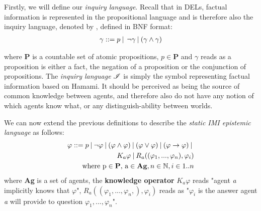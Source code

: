 Firstly, we will define our \textit{inquiry language}. Recall that in
DELs, factual information is represented in the propositional language
and is therefore also the inquiry language, denoted by \oracle, defined in BNF
format:
\begin{align}
    \gamma::= p \:|\:\:\neg\gamma\:|\:(\gamma\land\gamma) \label{eq:1}
\end{align}

where \textbf{P} is a countable set of atomic propositions, $p \in\mathbf{P}$
and $\gamma$ reads as a proposition is either a fact, the negation of a
proposition or the conjunction of propositions. The \textit{inquiry language}
$\mathscr{I}$ is simply the symbol representing factual information based on
Hamami\cite{delimi}. It should be perceived as being the source of
common knowledge between agents, and therefore also do not have any notion of
which agents know what, or any distinguish-ability between worlds.

We can now extend the previous definitions to describe the \textit{static IMI
    epistemic language} \staticlang\: as follows:
\begin{align}
    \begin{split}
        \varphi ::= p \:|\:\neg\varphi\:|\:(\varphi \land \varphi) \:|\: (\varphi \lor \varphi) \:|\: (\varphi \rightarrow \varphi) \:|\: \\K_a\varphi \:|\: R_a((\varphi_1,...,\varphi_n), \varphi_i) \\ \text{where p} \in \text{\textbf{P}}\text{, a} \in \text{\textbf{Ag}}, n \in \mathbb{N}, i \in 1..n \label{eq:2}
    \end{split}
\end{align}
where \textbf{Ag} is a set of agents, the \textbf{knowledge operator} $K_a\varphi$ reads "agent \textit{a} implicitly knows that $\varphi$",  $R_a((\varphi_1,...,\varphi_n,), \varphi_i)$ reads as "$\varphi_i$ is the answer agent \textit{a} will provide to question $\varphi_1,...,\varphi_n$". \\

